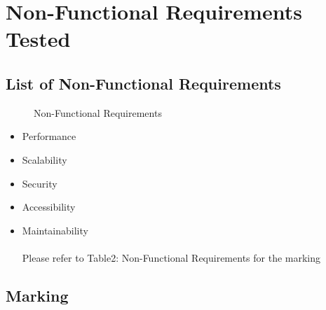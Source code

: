 \documentclass[12pt]{article}
\begin{document}
		



\section{Non-Functional Requirements Tested}
	\subsection{List of Non-Functional Requirements}

\begin{description}
	\item[] Non-Functional Requirements
\end{description}
\begin{itemize}
	
	\item Performance 
	\item Scalability 
	\item Security 
	\item Accessibility
	\item Maintainability \\ \\
	Please refer to Table2: Non-Functional Requirements for the marking
	
\end{itemize}

\subsection{Marking}
\end{document}
